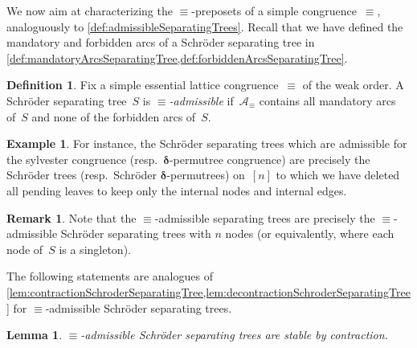 \documentclass{amsart}
\newtheorem{lemma}[theorem]{Lemma}
\theoremstyle{definition}
\newtheorem{definition}[theorem]{Definition}
\newtheorem{example}[theorem]{Example}
\newtheorem{remark}[theorem]{Remark}
\renewcommand{\b}[1]{{\boldsymbol{#1}}} %
\newcommand{\darkblue}{\color{darkblue}} %
\newcommand{\defn}[1]{\textsl{\darkblue #1}} %
\newcommand{\arcs}{{\mathcal{A}}} %
\newcommand{\decoration}{{\b{\delta}}} %
\begin{document}
We now aim at characterizing the $\equiv$-preposets of a simple congruence~$\equiv$, analoguously to \cref{def:admissibleSeparatingTrees}.
Recall that we have defined the mandatory and forbidden arcs of a Schröder separating tree in \cref{def:mandatoryArcsSeparatingTree,def:forbiddenArcsSeparatingTree}.

\begin{definition}
\label{def:admissibleSchroderSeparatingTrees}
Fix a simple essential lattice congruence~$\equiv$ of the weak order.
A Schröder separating tree~$S$ is \defn{$\equiv$-admissible} if~$\arcs_\equiv$ contains all mandatory arcs of~$S$ and none of the forbidden arcs of~$S$.
\end{definition}

\begin{example}
For instance, the Schröder separating trees which are admissible for the sylvester congruence (resp.~$\decoration$-permutree congruence) are precisely the Schröder trees (resp.~Schröder  $\decoration$-permutrees) on~$[n]$ to which we have deleted all pending leaves to keep only the internal nodes and internal edges.
\end{example}

\begin{remark}
Note that the $\equiv$-admissible separating trees are precisely the $\equiv$-admissible Schröder separating trees with $n$ nodes (or equivalently, where each node of~$S$ is a singleton).
\end{remark}

The following statements are analogues of \cref{lem:contractionSchroderSeparatingTree,lem:decontractionSchroderSeparatingTree} for $\equiv$-admissible Schröder separating trees.

\begin{lemma}
\label{lem:contractionAdmissibleSchroderSeparatingTree}
$\equiv$-admissible Schröder separating trees are stable by contraction.
\end{lemma}
\end{document}
